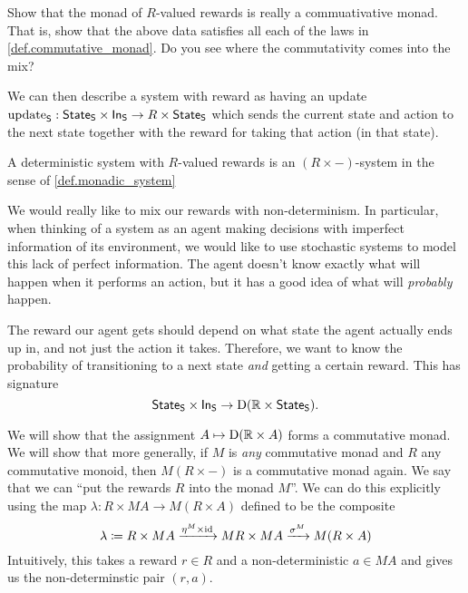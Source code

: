 \documentclass[DynamicalBook]{subfiles}
\begin{document}
\begin{exercise}
  Show that the monad of $R$-valued rewards is really a commuativative monad.
  That is, show that the above data satisfies all each of the laws in
  \cref{def.commutative_monad}. Do you see where the commutativity comes into
  the mix?
\end{exercise}

We can then describe a system with reward as having an update $\mathrm{update}_{\mathsf{S}} :
\mathsf{State}_{\mathsf{S}} \times \mathsf{In}_{\mathsf{S}} \to R \times \mathsf{State}_{\mathsf{S}}$ which sends the current state
and action to the next state together with the reward for taking that action (in
that state).

\begin{definition}
A deterministic system with $R$-valued rewards is an $(R \times -)$-system in
the sense of \cref{def.monadic_system}
\end{definition}

We would really like to mix our rewards with non-determinism. In particular,
when thinking of a system as an agent making decisions with imperfect
information of its environment, we would like to use stochastic systems to model
this lack of perfect information. The agent doesn't know exactly what will
happen when it performs an action, but it has a good idea of what will
\emph{probably} happen.


The reward our agent gets should depend on what state the
agent actually ends up in, and not just the action it takes. Therefore, we want to know the probability of transitioning to a next state \emph{and}
getting a certain reward. This has signature
\[
  \mathsf{State}_{\mathsf{S}} \times \mathsf{In}_{\mathsf{S}} \to \mathrm{D}(\mathbb{R} \times \mathsf{State}_{\mathsf{S}}).
\]

We will show that the assignment $A \mapsto \mathrm{D}(\mathbb{R} \times A)$
 forms a commutative monad. We will show that more generally, if $M$ is
 \emph{any} commutative monad and $R$ any commutative monoid, then $M(R \times
 -)$ is a commutative monad again. We say that we can ``put the rewards $R$ into
 the monad $M$''. We can do this explicitly using the map $\lambda : R \times MA
 \to M(R \times A)$ defined to be the composite
 \[
\lambda \coloneqq R \times MA \xrightarrow{\eta^M \times \mathrm{id}} MR \times MA \xrightarrow{\sigma^M} M(R \times A)
 \]
Intuitively, this takes a reward $r \in R$ and a non-deterministic $a \in MA$
and gives us the non-determinstic pair $(r, a)$.
 
\end{document}
